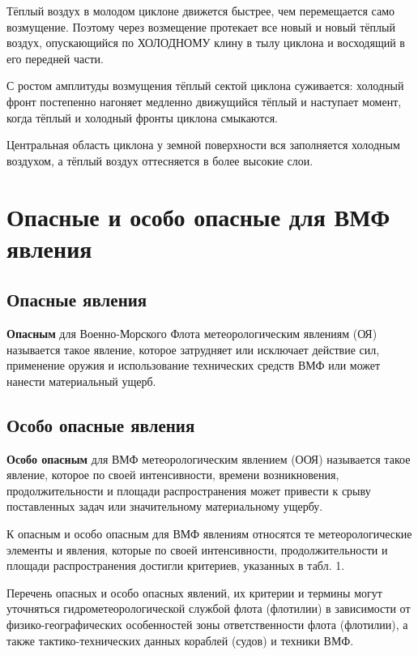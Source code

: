 \documentclass[a4paper, 12pt, twoside, final, book, russian, fittopage, cyremdash, openright]{ncc}
\begin{document}
Тёплый воздух в молодом циклоне движется быстрее, чем перемещается
само возмущение. Поэтому через возмещение протекает все новый и новый
тёплый воздух, опускающийся по ХОЛОДНОМУ клину в тылу циклона и
восходящий в его передней части.

С ростом амплитуды возмущения тёплый сектой циклона суживается:
холодный фронт постепенно нагоняет медленно движущийся тёплый и
наступает момент, когда тёплый и холодный фронты циклона смыкаются.

Центральная область циклона у земной поверхности вся заполняется
холодным воздухом, а тёплый воздух оттесняется в более высокие слои.

\section{Опасные и особо опасные для ВМФ явления}
\label{sec:dangerous}

\subsection{Опасные явления}

\textbf{Опасным} для Военно-Морского Флота метеорологическим явлениям
(ОЯ) называется такое явление, которое затрудняет или исключает
действие сил, применение оружия и использование технических средств
ВМФ или может нанести материальный ущерб.

\subsection{Особо опасные явления}

\textbf{Особо опасным} для ВМФ метеорологическим явлением (ООЯ)
называется такое явление, которое по своей интенсивности, времени
возникновения, продолжительности и площади распространения может
привести к срыву поставленных задач или значительному материальному
ущербу.

К опасным и особо опасным для ВМФ явлениям относятся те
метеорологические элементы и явления, которые по своей интенсивности,
продолжительности и площади распространения достигли критериев,
указанных в табл. 1.

Перечень опасных и особо опасных явлений, их критерии и термины могут
уточняться гидрометеорологической службой флота (флотилии) в
зависимости от физико-географических особенностей зоны ответственности
флота (флотилии), а также тактико-технических данных кораблей (судов)
и техники ВМФ.
\end{document}
